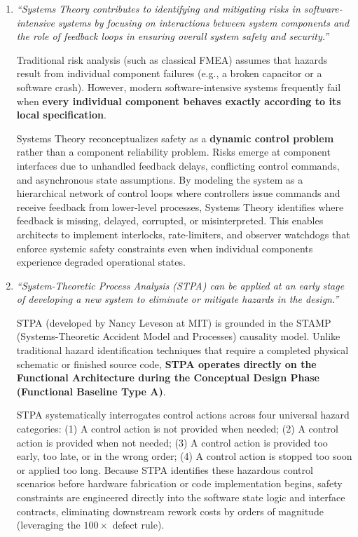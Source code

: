 \begin{enumerate}[label=(\alph*), itemsep=6pt]
    \item \textit{``Systems Theory contributes to identifying and mitigating risks in software-intensive systems by focusing on interactions between system components and the role of feedback loops in ensuring overall system safety and security.''}
    \begin{tcolorbox}[colback=white,colframe=sePrimary,title={\small \textbf{Model Analysis 2(a):}}]
    Traditional risk analysis (such as classical FMEA) assumes that hazards result from individual component failures (e.g., a broken capacitor or a software crash). However, modern software-intensive systems frequently fail when \textbf{every individual component behaves exactly according to its local specification}. 
    
    Systems Theory reconceptualizes safety as a \textbf{dynamic control problem} rather than a component reliability problem. Risks emerge at component interfaces due to unhandled feedback delays, conflicting control commands, and asynchronous state assumptions. By modeling the system as a hierarchical network of control loops where controllers issue commands and receive feedback from lower-level processes, Systems Theory identifies where feedback is missing, delayed, corrupted, or misinterpreted. This enables architects to implement interlocks, rate-limiters, and observer watchdogs that enforce systemic safety constraints even when individual components experience degraded operational states.
    \end{tcolorbox}

    \item \textit{``System-Theoretic Process Analysis (STPA) can be applied at an early stage of developing a new system to eliminate or mitigate hazards in the design.''}
    \begin{tcolorbox}[colback=white,colframe=sePrimary,title={\small \textbf{Model Analysis 2(b):}}]
    STPA (developed by Nancy Leveson at MIT) is grounded in the STAMP (Systems-Theoretic Accident Model and Processes) causality model. Unlike traditional hazard identification techniques that require a completed physical schematic or finished source code, \textbf{STPA operates directly on the Functional Architecture during the Conceptual Design Phase (Functional Baseline Type A)}.
    
    STPA systematically interrogates control actions across four universal hazard categories: (1) A control action is not provided when needed; (2) A control action is provided when not needed; (3) A control action is provided too early, too late, or in the wrong order; (4) A control action is stopped too soon or applied too long. Because STPA identifies these hazardous control scenarios before hardware fabrication or code implementation begins, safety constraints are engineered directly into the software state logic and interface contracts, eliminating downstream rework costs by orders of magnitude (leveraging the $100\times$ defect rule).
    \end{tcolorbox}


\end{enumerate}
